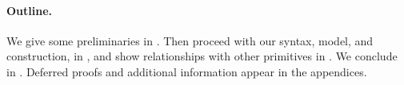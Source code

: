 %     



\paragraph{Outline.} %
We give some preliminaries in . Then proceed with our
\UAS syntax, model, and construction, in , and show
relationships with other primitives in . We conclude
in . Deferred proofs and additional information appear
in the appendices.

